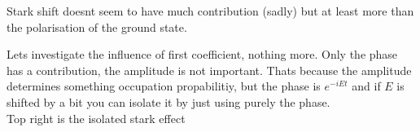 \bigskip
Stark shift doesnt seem to have much contribution (sadly) but at least more than the polarisation of the ground state.

Lets investigate the influence of first coefficient, nothing more. Only the phase has a contribution, the amplitude is not important.
Thats because the amplitude determines something occupation propabilitiy, but the phase is $e^{-iEt}$ and if $E$ is shifted by a bit you can isolate it by just using purely the phase.\\
Top right is the isolated stark effect



















